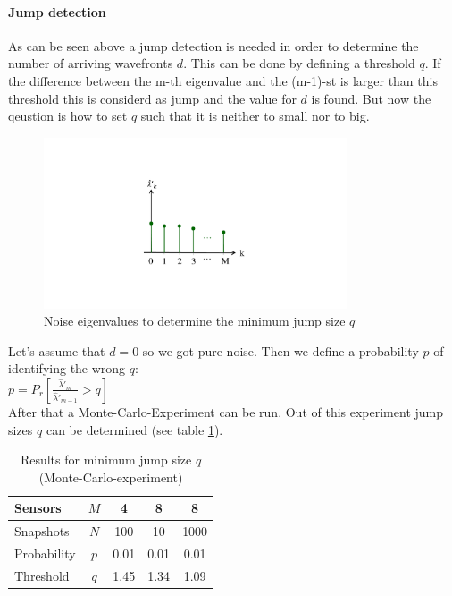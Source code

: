\newpage
\paragraph{Jump detection}
As can be seen above a jump detection is needed in order to determine the number of arriving wavefronts $d$. This can be done by defining a threshold $q$. If the difference between the m-th eigenvalue and the (m-1)-st is larger than this threshold this is considerd as jump and the value for $d$ is found. But now the qeustion is how to set $q$ such that it is neither to small nor to big.\\

\begin{figure}[H]
	\centering
		\includegraphics[trim =5cm 5cm 5cm 4cm, clip, width=0.80\textwidth]{graphics/jump_detection_noise.pdf}
	\caption{Noise eigenvalues to determine the minimum jump size $q$}
	\label{fig:jump_detection_noise}
\end{figure}

Let's assume that $d=0$ so we got pure noise. Then we define a probability $p$ of identifying the wrong  $q$:\\

$p=P_r\left[\frac{\hat{\lambda}'_m}{\hat{\lambda}'_{m-1}}>q\right]$\\
After that a Monte-Carlo-Experiment can be run. Out of this experiment jump sizes $q$ can be determined (see table \ref{tab:min_step_size_q}).\\
\begin{table}[H]
\begin{center}
\begin{tabular}{lc|c|c|c}
Sensors&$M$&4&8&8\\
\hline
Snapshots&$N$&100&10&1000\\
\hline
Probability&$p$&0.01&0.01&0.01\\
\hline
Threshold&$q$&\textcolor[rgb]{1,0,0}{1.45}&\textcolor[rgb]{1,0,0}{1.34}&\textcolor[rgb]{1,0,0}{1.09}\\
\end{tabular}
\end{center}
\caption{Results for minimum jump size $q$ (Monte-Carlo-experiment)}
\label{tab:min_step_size_q}
\end{table}

